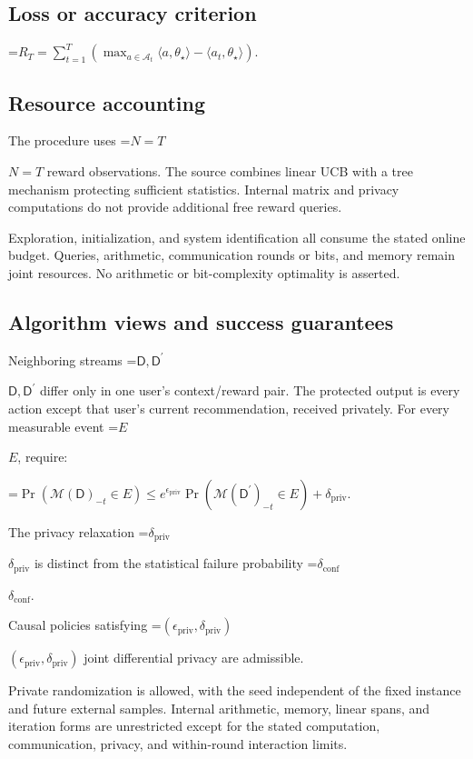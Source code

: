 \documentclass[10pt,a4paper]{article}
\newcommand{\AtlasMath}[1]{\par\begingroup\centering\setbox0=\hbox{$\displaystyle #1$}\ifdim\wd0>1.4\linewidth\typeout{ATLAS WIDE FORMULA: \the\wd0}\fi\ifdim\wd0>\linewidth\resizebox{\linewidth}{!}{\box0}\else\box0\fi\par\endgroup}
\newcommand{\AtlasInlineMath}[1]{\begingroup\setbox0=\hbox{$#1$}\ifdim\wd0>.4\linewidth\endgroup\AtlasMath{#1}\else\endgroup$#1$\fi}
\begin{document}
\subsection{Loss or accuracy criterion}

\AtlasMath{R_T=\sum_{t=1}^{T}\left(\max_{a\in\mathcal{A}_t}\langle a,\theta_\star\rangle-\langle a_t,\theta_\star\rangle\right).}


\subsection{Resource accounting}
The procedure uses \AtlasInlineMath{N=T} reward observations. The source combines linear UCB with a tree mechanism protecting sufficient statistics. Internal matrix and privacy computations do not provide additional free reward queries.

Exploration, initialization, and system identification all consume the stated online budget. Queries, arithmetic, communication rounds or bits, and memory remain joint resources. No arithmetic or bit-complexity optimality is asserted.

\subsection{Algorithm views and success guarantees}
Neighboring streams \AtlasInlineMath{\mathsf D,\mathsf D^{\prime}} differ only in one user's context/reward pair. The protected output is every action except that user's current recommendation, received privately. For every measurable event \AtlasInlineMath{E}, require:


\AtlasMath{\Pr\!\left(\mathcal{M}(\mathsf D)_{-t}\in E\right)\le e^{\epsilon_{\mathrm{priv}}}\Pr\!\left(\mathcal{M}(\mathsf D^{\prime})_{-t}\in E\right)+\delta_{\mathrm{priv}}.}


The privacy relaxation \AtlasInlineMath{\delta_{\mathrm{priv}}} is distinct from the statistical failure probability \AtlasInlineMath{\delta_{\mathrm{conf}}}.

Causal policies satisfying \AtlasInlineMath{(\epsilon_{\mathrm{priv}},\delta_{\mathrm{priv}})} joint differential privacy are admissible.

Private randomization is allowed, with the seed independent of the fixed instance and future external samples. Internal arithmetic, memory, linear spans, and iteration forms are unrestricted except for the stated computation, communication, privacy, and within-round interaction limits.
\end{document}

